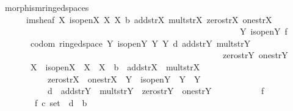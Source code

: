 \documentclass[12pt]{scrartcl}
\begin{document}
\begin{isabelle}
\isamarkupfalse%
\ morphism{\isacharunderscore}{\kern0pt}ringed{\isacharunderscore}{\kern0pt}spaces\ {\isacharequal}{\kern0pt}\isanewline
\ \ \ \ \ \ im{\isacharunderscore}{\kern0pt}sheaf\ X\ is{\isacharunderscore}{\kern0pt}open\isactrlsub X\ {\isasymO}\isactrlsub X\ {\isasymrho}\isactrlsub X\ b\ add{\isacharunderscore}{\kern0pt}str\isactrlsub X\ mult{\isacharunderscore}{\kern0pt}str\isactrlsub X\ zero{\isacharunderscore}{\kern0pt}str\isactrlsub X\ one{\isacharunderscore}{\kern0pt}str\isactrlsub X\ \isanewline
\ \ \ \ \ \ \ \ \ \ \ \ \ \ \ \ \ \ \ \ \ \ \ \ \ \ \ \ \ \ \ \ \ \ \ \ \ \ \ \ \ \ \ \ \ \ \ \ \ \ \ \ \ \ \ \ Y\ is{\isacharunderscore}{\kern0pt}open\isactrlsub Y\ f\ \isanewline
\ \ \ \ \ \ {\isacharplus}{\kern0pt}\ codom{\isacharcolon}{\kern0pt}\ ringed{\isacharunderscore}{\kern0pt}space\ Y\ is{\isacharunderscore}{\kern0pt}open\isactrlsub Y\ {\isasymO}\isactrlsub Y\ {\isasymrho}\isactrlsub Y\ d\ add{\isacharunderscore}{\kern0pt}str\isactrlsub Y\ mult{\isacharunderscore}{\kern0pt}str\isactrlsub Y\ \isanewline
\ \ \ \ \ \ \ \ \ \ \ \ \ \ \ \ \ \ \ \ \ \ \ \ \ \ \ \ \ \ \ \ \ \ \ \ \ \ \ \ \ \ \ \ \ \ \ \ \ \ \ \ zero{\isacharunderscore}{\kern0pt}str\isactrlsub Y\ one{\isacharunderscore}{\kern0pt}str\isactrlsub Y\isanewline
\ \ \ \ \ \ \ X\ \ is{\isacharunderscore}{\kern0pt}open\isactrlsub X\ \ {\isasymO}\isactrlsub X\ \ {\isasymrho}\isactrlsub X\ \ b\ \ add{\isacharunderscore}{\kern0pt}str\isactrlsub X\ \ mult{\isacharunderscore}{\kern0pt}str\isactrlsub X\isanewline
\ \ \ \ \ \ \ \ \ \ \ zero{\isacharunderscore}{\kern0pt}str\isactrlsub X\ \ one{\isacharunderscore}{\kern0pt}str\isactrlsub X\ \ Y\ \ is{\isacharunderscore}{\kern0pt}open\isactrlsub Y\ \ {\isasymO}\isactrlsub Y\ \ {\isasymrho}\isactrlsub Y\ \isanewline
\ \ \ \ \ \ \ \ \ \ \ d\ \ add{\isacharunderscore}{\kern0pt}str\isactrlsub Y\ \ mult{\isacharunderscore}{\kern0pt}str\isactrlsub Y\ \ zero{\isacharunderscore}{\kern0pt}str\isactrlsub Y\ \ one{\isacharunderscore}{\kern0pt}str\isactrlsub Y\isanewline
\ \ \ \ \ \ \ \ \ \ \ f\ \isanewline
\ \ \ \ \ \ {\isacharplus}{\kern0pt}\ \ {\isasymphi}\isactrlsub f{\isacharcolon}{\kern0pt}{\isacharcolon}{\kern0pt}\ {\isachardoublequoteopen}{\isacharprime}{\kern0pt}c\ set\ {\isasymRightarrow}\ {\isacharparenleft}{\kern0pt}{\isacharprime}{\kern0pt}d\ {\isasymRightarrow}\ {\isacharprime}{\kern0pt}b{\isacharparenright}{\kern0pt}{\isachardoublequoteclose}\isanewline

\end{isabelle}
\end{document}
